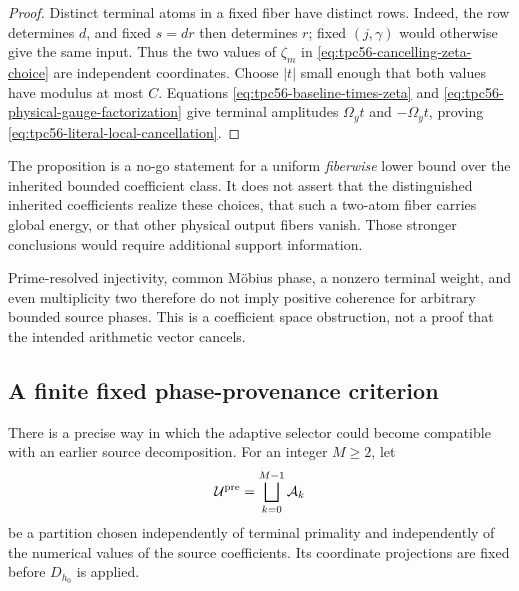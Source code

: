 \begin{proof}
Distinct terminal atoms in a fixed fiber have distinct rows.  Indeed, the
row determines \(d\), and fixed \(s=dr\) then determines \(r\); fixed
\((j,\gamma)\) would otherwise give the same input.  Thus the two values of
\(\zeta_m\) in \eqref{eq:tpc56-cancelling-zeta-choice} are independent
coordinates.  Choose \(|t|\) small enough that both values have modulus at
most \(C\).  Equations \eqref{eq:tpc56-baseline-times-zeta} and
\eqref{eq:tpc56-physical-gauge-factorization} give terminal amplitudes
\(\Omega_yt\) and \(-\Omega_yt\), proving
\eqref{eq:tpc56-literal-local-cancellation}.
\end{proof}

The proposition is a no-go statement for a uniform \emph{fiberwise} lower
bound over the inherited bounded coefficient class.  It does not assert
that the distinguished inherited coefficients realize these choices, that
such a two-atom fiber carries global energy, or that other physical output
fibers vanish.  Those stronger conclusions would require additional
support information.

Prime-resolved injectivity, common M\"obius phase, a nonzero terminal
weight, and even multiplicity two therefore do not imply positive
coherence for arbitrary bounded source phases.  This is a coefficient
space obstruction, not a proof that the intended arithmetic vector
cancels.

\subsection{A finite fixed phase-provenance criterion}

There is a precise way in which the adaptive selector could become
compatible with an earlier source decomposition.  For an integer
\(M\ge2\), let
\begin{equation}
 \mathcal U^{\rm pre}=\bigsqcup_{k=0}^{M-1}\mathcal A_k
 \label{eq:tpc56-preterminal-phase-partition}
\end{equation}
be a partition chosen independently of terminal primality and independently
of the numerical values of the source coefficients.  Its coordinate
projections are fixed before \(D_{h_0}\) is applied.

